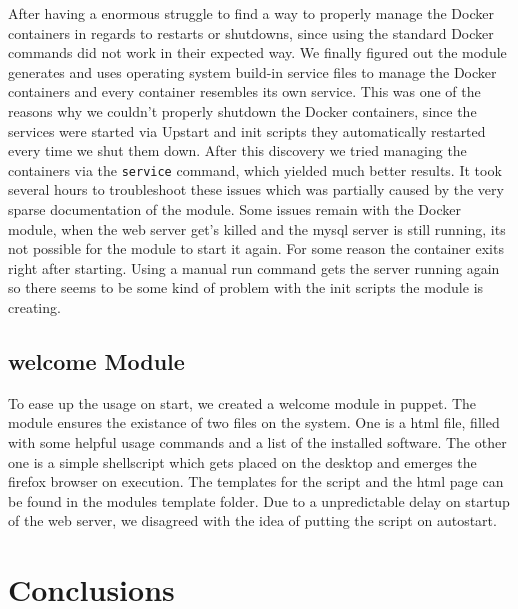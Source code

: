 After having a enormous struggle to find a way to properly manage the Docker containers in regards to restarts or shutdowns, since using the standard Docker commands did not work in their expected way. We finally figured out the module generates and uses operating system build-in service files to manage the Docker containers and every container resembles its own service. This was one of the reasons why we couldn't properly shutdown the Docker containers, since the services were started via Upstart and init scripts they automatically restarted every time we shut them down. After this discovery we tried managing the containers via the \verb|service| command, which yielded much better results. It took several hours to troubleshoot these issues which was partially caused by the very sparse documentation of the module. Some issues remain with the Docker module, when the web server get's killed and the mysql server is still running, its not possible for the module to start it again. For some reason the container exits right after starting. Using a manual run command gets the server running again so there seems to be some kind of problem with the init scripts the module is creating.

\subsection{welcome Module}
To ease up the usage on start, we created a welcome module in puppet. The module ensures the existance of two files on the system. One is a html file, filled with some helpful usage commands and a list of the installed software. The other one is a simple shellscript which gets placed on the desktop and emerges the firefox browser on execution. The templates for the script and the html page can be found in the modules template folder. Due to a unpredictable delay on startup of the web server, we disagreed with the idea of putting the script on autostart.




\section{Conclusions}

